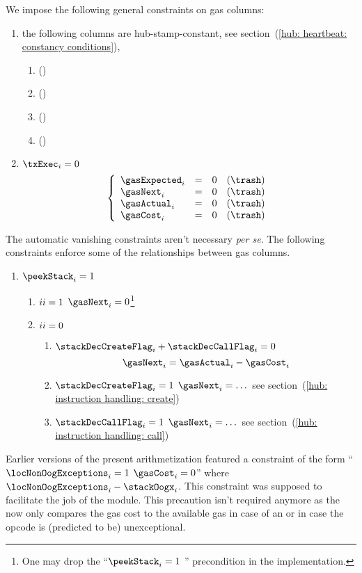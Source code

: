 We impose the following general constraints on gas columns:
\begin{enumerate}
	\item the following columns are hub-stamp-constant, see section~(\ref{hub: heartbeat: constancy conditions}),
		\begin{multicols}{2}
			\begin{enumerate}
				\item \gasExpected{} \quad (\sanityCheck)
				\item \gasNext{}     \quad (\sanityCheck)
				\item \gasActual{}   \quad (\sanityCheck)
				\item \gasCost{}     \quad (\sanityCheck)
			\end{enumerate}
		\end{multicols}
	\item \If $\txExec _{i} = 0$ \Then
		\[
			\left\{ \begin{array}{lclr}
				\gasExpected _{i} & = & 0 & (\trash) \\
				\gasNext     _{i} & = & 0 & (\trash) \\
				\gasActual   _{i} & = & 0 & (\trash) \\
				\gasCost     _{i} & = & 0 & (\trash) \\
			\end{array} \right.
		\]
\end{enumerate}
The automatic vanishing constraints aren't necessary \emph{per se}.
The following constraints enforce some of the relationships between gas columns.
\begin{enumerate}[resume]
	\item \If $\peekStack _{i} = 1$ \Then
		\begin{enumerate}
			\item \If $\xAhoy_{i} = 1$ \Then $\gasNext_{i} = 0$\footnote{One may drop the ``\If $\peekStack _{i} = 1$ \Then'' precondition in the implementation.}
			\item \If $\xAhoy_{i} = 0$ \Then
				\begin{enumerate}
					\item \If $\stackDecCreateFlag _{i} + \stackDecCallFlag _{i} = 0$ \Then
						\[ \gasNext_{i} = \gasActual_{i} - \gasCost_{i} \]
					\item \If $\stackDecCreateFlag _{i} = 1$ \Then $\gasNext_{i} = \dots$ see section~(\ref{hub: instruction handling: create})
					\item \If $\stackDecCallFlag   _{i} = 1$ \Then $\gasNext_{i} = \dots$ see section~(\ref{hub: instruction handling: call})
				\end{enumerate}
		\end{enumerate}
\end{enumerate}
\saNote{}
Earlier versions of the present arithmetization featured a constraint of the form
``\If $\locNonOogExceptions _{i} = 1$ \Then $\gasCost _{i} = 0$''
where $\locNonOogExceptions _{i} \def \xAhoy _{i} - \stackOogx_{i}$.
This constraint was supposed to facilitate the job of the \gasMod{} module.
This precaution isn't required anymore as the \gasMod{} now only compares the gas cost to the available gas in case of an \oogxSH{} or in case the opcode is (predicted to be) unexceptional.


